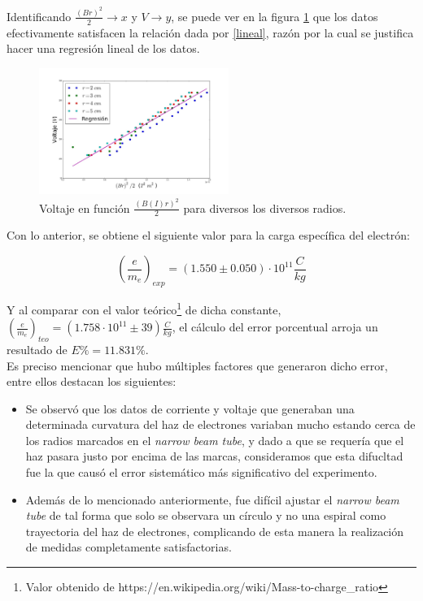 \documentclass[prb,aps,twocolumn,preprintnumbers,amsmath,amssymb]{revtex4}
\begin{document}
Identificando $\frac{(Br)^2}{2} \rightarrow x$ y $V \rightarrow y$, se puede ver en la figura \ref{fig:lineal} que los datos efectivamente satisfacen la relación dada por \eqref{lineal}, razón por la cual se justifica hacer una regresión lineal de los datos.\\

\begin{figure}[h!]
	\centering
	\includegraphics[width=0.55\textwidth]{carga-masa-reg}
	\caption{Voltaje en función $\frac{(B(I)r)^2}{2}$ para diversos los diversos radios.}
	\label{fig:lineal}
\end{figure}

Con lo anterior, se obtiene el siguiente valor para la carga específica del electrón:

\begin{equation}
\left( \frac{e}{m_{e}} \right)_{exp} = (1.550 \pm 0.050) \cdot 10^{11} \frac{C}{kg} 
\end{equation}

Y al comparar con el valor teórico\footnote{Valor obtenido de https://en.wikipedia.org/wiki/Mass-to-charge\_ratio} de dicha constante, $\left( \frac{e}{m_{e}} \right)_{teo} = (1.758 \cdot 10^{11}  \pm 39)  \frac{C}{kg}$, el cálculo del error porcentual arroja un resultado de $E\% = 11.831\%$.\\

Es preciso mencionar que hubo múltiples factores que generaron dicho error, entre ellos destacan los siguientes:

\begin{itemize}
	\item Se observó que los datos de corriente y voltaje que generaban una determinada curvatura del haz de electrones variaban mucho estando cerca de los radios marcados en el \textit{narrow beam tube}, y dado a que se requería que el haz pasara justo por encima de las marcas, consideramos que esta difucltad fue la que causó el error sistemático más significativo del experimento.
	
	\item Además de lo mencionado anteriormente, fue difícil ajustar el \textit{narrow beam tube} de tal forma que solo se observara un círculo y no una espiral como trayectoria del haz de electrones, complicando de esta manera la realización de medidas completamente satisfactorias.
\end{itemize}
	
\end{document}
